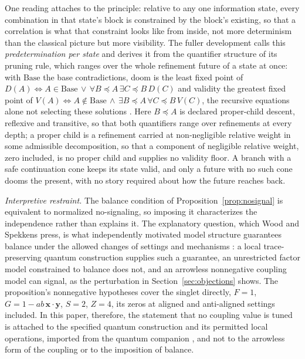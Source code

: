 \documentclass[11pt]{article}
\begin{document}
\noindent One reading attaches to the principle: relative to any one information state, every combination in that state's block is constrained by the block's existing, so that a correlation is what that constraint looks like from inside, not more determinism than the classical picture but more visibility. The fuller development calls this \emph{predetermination per state} and derives it from the quantifier structure of its pruning rule, which ranges over the whole refinement future of a state at once: with $\mathrm{Base}$ the base contradictions, doom is the least fixed point of $D(A) \iff A \in \mathrm{Base} \,\lor\, \forall B \preceq A\, \exists C \preceq B\, D(C)$ and validity the greatest fixed point of $V(A) \iff A \notin \mathrm{Base} \,\land\, \exists B \preceq A\, \forall C \preceq B\, V(C)$, the recursive equations alone not selecting these solutions \cite{Aethus}. Here $B \preceq A$ is declared proper-child descent, reflexive and transitive, so that both quantifiers range over refinements at every depth; a proper child is a refinement carried at non-negligible relative weight in some admissible decomposition, so that a component of negligible relative weight, zero included, is no proper child and supplies no validity floor. A branch with a safe continuation cone keeps its state valid, and only a future with no such cone dooms the present, with no story required about how the future reaches back.

\noindent\textit{Interpretive restraint.} The balance condition of Proposition~\ref{prop:nosignal} is equivalent to normalized no-signaling, so imposing it characterizes the independence rather than explains it. The explanatory question, which Wood and Spekkens press, is what independently motivated model structure guarantees balance under the allowed changes of settings and mechanisms \cite{wood_spekkens_2015}: a local trace-preserving quantum construction supplies such a guarantee, an unrestricted factor model constrained to balance does not, and an arrowless nonnegative coupling model can signal, as the perturbation in Section~\ref{sec:objections} shows. The proposition's nonnegative hypotheses cover the singlet directly, $F = 1$, $G = 1 - ab\,\mathbf{x}\cdot\mathbf{y}$, $S = 2$, $Z = 4$, its zeros at aligned and anti-aligned settings included. In this paper, therefore, the statement that no coupling value is tuned is attached to the specified quantum construction and its permitted local operations, imported from the quantum companion \cite{AethusQuant}, and not to the arrowless form of the coupling or to the imposition of balance.
\end{document}
